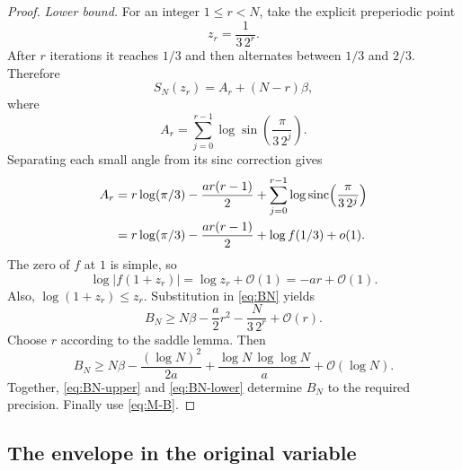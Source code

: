 \documentclass[11pt,oneside]{article}
\theoremstyle{definition}
\theoremstyle{remark}
\newcommand{\sinc}{\operatorname{sinc}}
\newcommand{\bigO}{\mathcal O}
\newcommand{\smallo}{o}
\begin{document}
\begin{proof}
\emph{Lower bound.}
For an integer $1\le r<N$, take the explicit preperiodic point
\begin{equation}
 z_r=\frac{1}{3\,2^r}.                                      \label{eq:zr}
\end{equation}
After $r$ iterations it reaches $1/3$ and then alternates between $1/3$ and
$2/3$.  Therefore
\begin{equation}
 S_N(z_r)=A_r+(N-r)\beta,                                   \label{eq:SN-zr}
\end{equation}
where
\begin{equation}
 A_r=\sum_{j=0}^{r-1}\log\sin\!\left(\frac{\pi}{3\,2^j}\right).
\end{equation}
Separating each small angle from its sinc correction gives
\begin{align}
 A_r
 & =r\log(\pi/3)-\frac{ar(r-1)}2
 +\sum_{j=0}^{r-1}\log\sinc\!\left(\frac{\pi}{3\,2^j}\right)\notag\\
 & =r\log(\pi/3)-\frac{ar(r-1)}2+\log f(1/3)+\smallo(1).   \label{eq:Ar-asymp}
\end{align}
The zero of $f$ at $1$ is simple, so
\begin{equation}
 \log|f(1+z_r)|=\log z_r+\bigO(1)=-ar+\bigO(1).             \label{eq:f-near-one}
\end{equation}
Also, $\log(1+z_r)\le z_r$.  Substitution in \eqref{eq:BN} yields
\begin{equation}
 B_N\ge N\beta-\frac a2r^2-\frac{N}{3\,2^r}+\bigO(r).     \label{eq:BN-lower-r}
\end{equation}
Choose $r$ according to the saddle lemma.  Then
\begin{equation}
 B_N\ge N\beta-
\frac{(\log N)^2}{2a}
 +\frac{\log N\,\log\log N}{a}+\bigO(\log N).             \label{eq:BN-lower}
\end{equation}
Together, \eqref{eq:BN-upper} and \eqref{eq:BN-lower} determine $B_N$ to the
required precision.  Finally use \eqref{eq:M-B}.
\end{proof}

\subsection{The envelope in the original variable}
\end{document}
